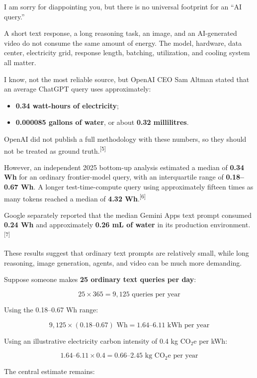 \documentclass{article}
\begin{document}
I am sorry for diappointing you, but there is no universal footprint for an ``AI query.''

A short text response, a long reasoning task, an image, and an AI-generated video do not consume the same amount of energy. The model, hardware, data center, electricity grid, response length, batching, utilization, and cooling system all matter.

I know, not the most reliable source, but OpenAI CEO Sam Altman stated that an average ChatGPT query uses approximately:

\begin{itemize}[noitemsep]
    \item \textbf{0.34 watt-hours of electricity};
    \item \textbf{0.000085 gallons of water}, or about \textbf{0.32 millilitres}.
\end{itemize}

OpenAI did not publish a full methodology with these numbers, so they should not be treated as ground truth.\textsuperscript{[5]}

However, an independent 2025 bottom-up analysis estimated a median of \textbf{0.34 Wh} for an ordinary frontier-model query, with an interquartile range of \textbf{0.18--0.67 Wh}. A longer test-time-compute query using approximately fifteen times as many tokens reached a median of \textbf{4.32 Wh}.\textsuperscript{[6]}

Google separately reported that the median Gemini Apps text prompt consumed \textbf{0.24 Wh} and approximately \textbf{0.26 mL of water} in its production environment.\textsuperscript{[7]}

These results suggest that ordinary text prompts are relatively small, while long reasoning, image generation, agents, and video can be much more demanding.

Suppose someone makes \textbf{25 ordinary text queries per day}:

\[
25 \times 365 = 9{,}125 \text{ queries per year}
\]

Using the 0.18--0.67 Wh range:

\[
9{,}125 \times (0.18\text{--}0.67)\text{ Wh}
=
1.64\text{--}6.11\text{ kWh per year}
\]

Using an illustrative electricity carbon intensity of 0.4 kg CO$_2$e per kWh:

\[
1.64\text{--}6.11 \times 0.4
=
0.66\text{--}2.45 \text{ kg CO$_2$e per year}
\]

The central estimate remains:
\end{document}
